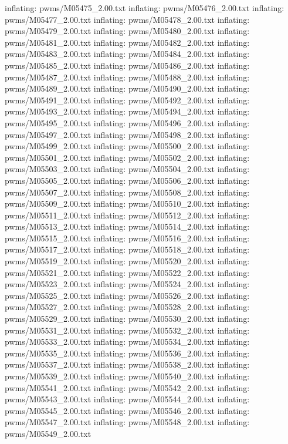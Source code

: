 \documentclass[letterpaper,10pt,english]{sphinxmanual}
\begin{document}
{\begin{sphinxVerbatim}[commandchars=\\\{\}]
  inflating: pwms/M05475\_2.00.txt
  inflating: pwms/M05476\_2.00.txt
  inflating: pwms/M05477\_2.00.txt
  inflating: pwms/M05478\_2.00.txt
  inflating: pwms/M05479\_2.00.txt
  inflating: pwms/M05480\_2.00.txt
  inflating: pwms/M05481\_2.00.txt
  inflating: pwms/M05482\_2.00.txt
  inflating: pwms/M05483\_2.00.txt
  inflating: pwms/M05484\_2.00.txt
  inflating: pwms/M05485\_2.00.txt
  inflating: pwms/M05486\_2.00.txt
  inflating: pwms/M05487\_2.00.txt
  inflating: pwms/M05488\_2.00.txt
  inflating: pwms/M05489\_2.00.txt
  inflating: pwms/M05490\_2.00.txt
  inflating: pwms/M05491\_2.00.txt
  inflating: pwms/M05492\_2.00.txt
  inflating: pwms/M05493\_2.00.txt
  inflating: pwms/M05494\_2.00.txt
  inflating: pwms/M05495\_2.00.txt
  inflating: pwms/M05496\_2.00.txt
  inflating: pwms/M05497\_2.00.txt
  inflating: pwms/M05498\_2.00.txt
  inflating: pwms/M05499\_2.00.txt
  inflating: pwms/M05500\_2.00.txt
  inflating: pwms/M05501\_2.00.txt
  inflating: pwms/M05502\_2.00.txt
  inflating: pwms/M05503\_2.00.txt
  inflating: pwms/M05504\_2.00.txt
  inflating: pwms/M05505\_2.00.txt
  inflating: pwms/M05506\_2.00.txt
  inflating: pwms/M05507\_2.00.txt
  inflating: pwms/M05508\_2.00.txt
  inflating: pwms/M05509\_2.00.txt
  inflating: pwms/M05510\_2.00.txt
  inflating: pwms/M05511\_2.00.txt
  inflating: pwms/M05512\_2.00.txt
  inflating: pwms/M05513\_2.00.txt
  inflating: pwms/M05514\_2.00.txt
  inflating: pwms/M05515\_2.00.txt
  inflating: pwms/M05516\_2.00.txt
  inflating: pwms/M05517\_2.00.txt
  inflating: pwms/M05518\_2.00.txt
  inflating: pwms/M05519\_2.00.txt
  inflating: pwms/M05520\_2.00.txt
  inflating: pwms/M05521\_2.00.txt
  inflating: pwms/M05522\_2.00.txt
  inflating: pwms/M05523\_2.00.txt
  inflating: pwms/M05524\_2.00.txt
  inflating: pwms/M05525\_2.00.txt
  inflating: pwms/M05526\_2.00.txt
  inflating: pwms/M05527\_2.00.txt
  inflating: pwms/M05528\_2.00.txt
  inflating: pwms/M05529\_2.00.txt
  inflating: pwms/M05530\_2.00.txt
  inflating: pwms/M05531\_2.00.txt
  inflating: pwms/M05532\_2.00.txt
  inflating: pwms/M05533\_2.00.txt
  inflating: pwms/M05534\_2.00.txt
  inflating: pwms/M05535\_2.00.txt
  inflating: pwms/M05536\_2.00.txt
  inflating: pwms/M05537\_2.00.txt
  inflating: pwms/M05538\_2.00.txt
  inflating: pwms/M05539\_2.00.txt
  inflating: pwms/M05540\_2.00.txt
  inflating: pwms/M05541\_2.00.txt
  inflating: pwms/M05542\_2.00.txt
  inflating: pwms/M05543\_2.00.txt
  inflating: pwms/M05544\_2.00.txt
  inflating: pwms/M05545\_2.00.txt
  inflating: pwms/M05546\_2.00.txt
  inflating: pwms/M05547\_2.00.txt
  inflating: pwms/M05548\_2.00.txt
  inflating: pwms/M05549\_2.00.txt

\end{sphinxVerbatim}}
\end{document}
